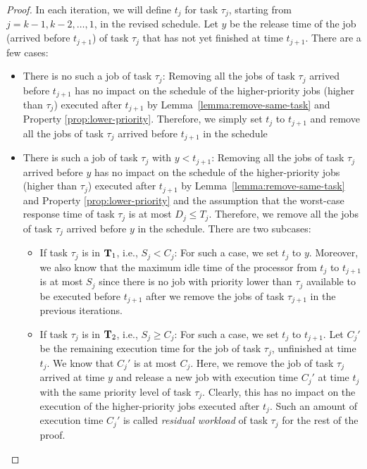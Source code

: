 \begin{proof}
In each iteration, we will define $t_j$ for task $\tau_j$, starting from $j=k-1, k-2, \ldots, 1$, in the revised schedule. Let $y$ be the release time of the job (arrived before $t_{j+1}$) of task $\tau_j$ that has not yet finished at time $t_{j+1}$. There are a few cases:
\begin{itemize}
\item There is no such a job of task $\tau_j$: Removing all the jobs of task $\tau_j$ arrived before $t_{j+1}$ has no impact on the schedule of the higher-priority jobs (higher than $\tau_j$) executed after $t_{j+1}$ by Lemma~\ref{lemma:remove-same-task} and Property \ref{prop:lower-priority}. Therefore, we simply set $t_j$ to $t_{j+1}$ and remove all the jobs of task $\tau_j$ arrived before $t_{j+1}$ in the schedule
\item There is such a job of task $\tau_j$ with $y < t_{j+1}$:  Removing all the jobs of task $\tau_j$ arrived before $y$ has no impact on the schedule of the higher-priority jobs (higher than $\tau_j$) executed after $t_{j+1}$ by Lemma~\ref{lemma:remove-same-task} and Property \ref{prop:lower-priority} and the assumption that the worst-case response time of task $\tau_j$ is at most $D_j \leq T_j$. Therefore, we remove all the jobs of task $\tau_j$ arrived before $y$ in the schedule. There are two subcases:
\begin{itemize}
\item If task $\tau_j$ is in ${\bf T}_1$, i.e., $S_j < C_j$: For such a case, we set $t_{j}$ to $y$. Moreover, we also know that the maximum idle time of the processor from $t_j$ to $t_{j+1}$ is at most $S_j$ since there is no job with priority lower than $\tau_j$ available to be executed before $t_{j+1}$ after we remove the jobs of task $\tau_{j+1}$ in the previous iterations.
\item If task $\tau_j$ is in ${\bf T}_2$, i.e., $S_j \geq C_j$: For such a case, we set $t_{j}$ to $t_{j+1}$. Let $C_j'$ be the remaining execution time for the job of task $\tau_j$, unfinished at time $t_j$. We know that $C_j'$ is at most $C_j$. Here, we remove the job of task $\tau_j$ arrived at time $y$ and release a new job with execution time $C_j'$  at time $t_j$ with the same priority level of task $\tau_j$. Clearly, this has no impact on the execution of the higher-priority jobs executed after $t_j$. Such an amount of execution time $C_j'$ is called \emph{residual workload} of task $\tau_j$ for the rest of the proof.
\end{itemize}
\end{itemize}
 

\end{proof}
